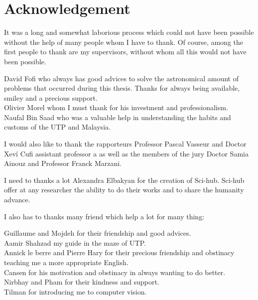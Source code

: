 \documentclass[english]{spimubphdthesis}
\begin{document}
\chapter*{Acknowledgement}
%

It was a long and somewhat laborious process which could not have been possible without the help of many people whom I have to thank.
Of course, among the first people to thank are my supervisors, without whom all this would not have been possible.

David Fofi who always has good advices to solve the astronomical amount of problems that occurred during this thesis. Thanks for always being  available, smiley and a precious support.  \\
Olivier Morel whom I must thank for his investment and professionalism. \\
Naufal Bin Saad who was a valuable help in understanding the habits and customs of the UTP and Malaysia.

I would also like to thank the rapporteurs Professor Pascal Vasseur  and Doctor Xev\'i  Cufi assistant professor a as well as the members of the jury Doctor Samia Ainouz  and  Professor Franck Marzani. 

I need to thanks a lot Alexandra Elbakyan for the creation  of Sci-hub. Sci-hub offer at any researcher the ability to do their works and to share the humanity advance.

I also has to  thanks many friend which help a lot for many thing:

Guillaume and Mojdeh  for their friendship and good advices.\\
Aamir Shahzad my guide in the maze of UTP.\\
Annick le berre and Pierre Hary  for their precious friendship and obstinacy teaching me a more appropriate English.\\
Cansen for his motivation and obstinacy in always wanting to do better.\\
Nirbhay and Pham  for their kindness and support.\\
Tilman for introducing me to computer vision.\\
\end{document}
